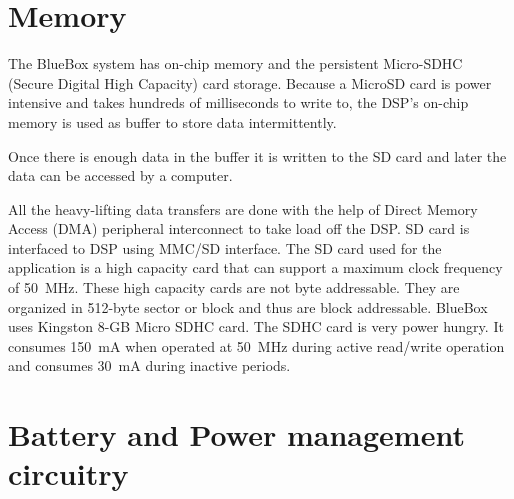 \section{Memory}
\label{memory}

The BlueBox system has on-chip memory and the persistent Micro-SDHC
(Secure Digital High Capacity) card storage. Because a MicroSD
card is power intensive and takes hundreds of milliseconds to write
to, the DSP's on-chip memory is used as buffer to store data intermittently.

Once there is enough data in the buffer it is written to the SD card
and later the data can be accessed by a computer.

All the heavy-lifting data transfers are done with the help of Direct
Memory Access (DMA) peripheral interconnect to take load off the DSP.
SD card is interfaced to DSP using MMC/SD interface. The SD card used
for the application is a high capacity card that can support a
maximum clock frequency of 50~MHz. These high capacity cards are not
byte addressable. They are organized in 512-byte sector or block and
thus are block addressable. BlueBox uses Kingston 8-GB Micro SDHC
card.  The SDHC card is very power hungry. It consumes 150~mA when
operated at 50~MHz during active read/write operation and consumes
30~mA during inactive periods.

\section{Battery and Power management circuitry}

